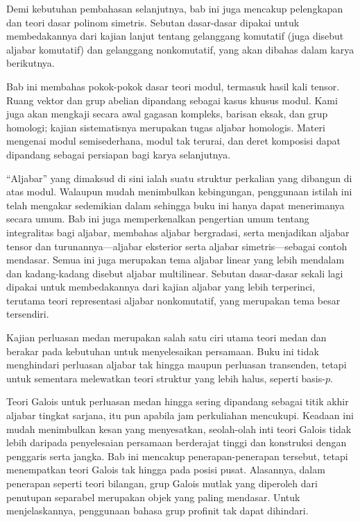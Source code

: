 \begin{asparadesc}
	\item[Bab 5: Dasar-dasar teori gelanggang] Demi kebutuhan pembahasan selanjutnya, bab ini juga mencakup pelengkapan dan teori dasar polinom simetris. Sebutan dasar-dasar dipakai untuk membedakannya dari kajian lanjut tentang gelanggang komutatif (juga disebut aljabar komutatif) dan gelanggang nonkomutatif, yang akan dibahas dalam karya berikutnya.
	
	\item[Bab 6: Teori modul] Bab ini membahas pokok-pokok dasar teori modul, termasuk hasil kali tensor. Ruang vektor dan grup abelian dipandang sebagai kasus khusus modul. Kami juga akan mengkaji secara awal gagasan kompleks, barisan eksak, dan grup homologi; kajian sistematisnya merupakan tugas aljabar homologis. Materi mengenai modul semisederhana, modul tak terurai, dan deret komposisi dapat dipandang sebagai persiapan bagi karya selanjutnya.
	
	\item[Bab 7: Dasar-dasar aljabar] ``Aljabar'' yang dimaksud di sini ialah suatu struktur perkalian yang dibangun di atas modul. Walaupun mudah menimbulkan kebingungan, penggunaan istilah ini telah mengakar sedemikian dalam sehingga buku ini hanya dapat menerimanya secara umum. Bab ini juga memperkenalkan pengertian umum tentang integralitas bagi aljabar, membahas aljabar bergradasi, serta menjadikan aljabar tensor dan turunannya—aljabar eksterior serta aljabar simetris—sebagai contoh mendasar. Semua ini juga merupakan tema aljabar linear yang lebih mendalam dan kadang-kadang disebut aljabar multilinear. Sebutan dasar-dasar sekali lagi dipakai untuk membedakannya dari kajian aljabar yang lebih terperinci, terutama teori representasi aljabar nonkomutatif, yang merupakan tema besar tersendiri.
	
	\item[Bab 8: Perluasan medan] Kajian perluasan medan merupakan salah satu ciri utama teori medan dan berakar pada kebutuhan untuk menyelesaikan persamaan. Buku ini tidak menghindari perluasan aljabar tak hingga maupun perluasan transenden, tetapi untuk sementara melewatkan teori struktur yang lebih halus, seperti basis-$p$.
	
	\item[Bab 9: Teori Galois] Teori Galois untuk perluasan medan hingga sering dipandang sebagai titik akhir aljabar tingkat sarjana, itu pun apabila jam perkuliahan mencukupi. Keadaan ini mudah menimbulkan kesan yang menyesatkan, seolah-olah inti teori Galois tidak lebih daripada penyelesaian persamaan berderajat tinggi dan konstruksi dengan penggaris serta jangka. Bab ini mencakup penerapan-penerapan tersebut, tetapi menempatkan teori Galois tak hingga pada posisi pusat. Alasannya, dalam penerapan seperti teori bilangan, grup Galois mutlak yang diperoleh dari penutupan separabel merupakan objek yang paling mendasar. Untuk menjelaskannya, penggunaan bahasa grup profinit tak dapat dihindari.


\end{asparadesc}
